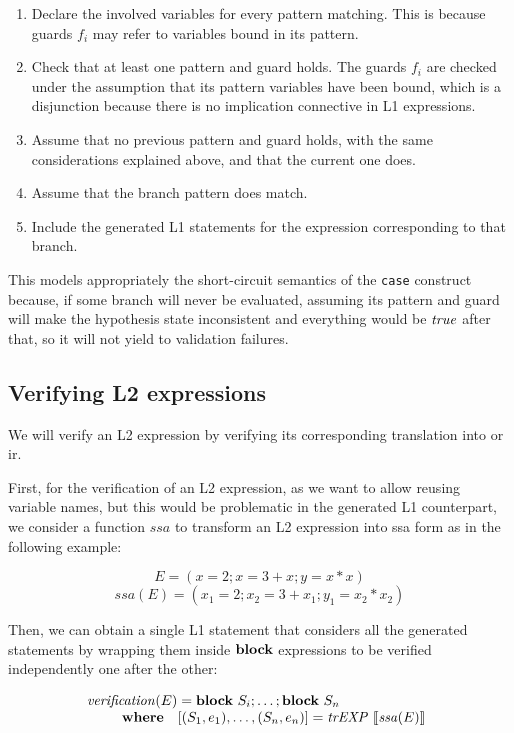 \begin{enumerate}
  \item Declare the involved variables for every pattern matching. This is because guards $f_i$ may refer to variables bound in its pattern.
  \item Check that at least one pattern and guard holds. The guards $f_i$ are checked under the assumption that its pattern variables have been bound, which is a disjunction because there is no implication connective in L1 expressions.
  \item Assume that no previous pattern and guard holds, with the same considerations explained above, and that the current one does.
  \item Assume that the branch pattern does match.
  \item Include the generated L1 statements for the expression corresponding to that branch.
\end{enumerate}

This models appropriately the short-circuit semantics of the \verb|case|
construct because, if some branch will never be evaluated, assuming its pattern
and guard will make the hypothesis state inconsistent and everything would be
$\mathit{true}$ after that, so it will not yield to validation failures.

\subsection{Verifying L2 expressions}
\label{sec:verificationprocess}

We will verify an L2 expression by verifying its corresponding translation into
or \gls{ir}.

First, for the verification of an L2 expression, as we want to allow reusing 
variable names, but this would be problematic in the generated L1 counterpart,
we consider a function $ssa$ to transform an L2 expression into \gls{ssa} form
as in the following example:

$$E =  (x = 2;x = 3 + x; y = x * x)$$
$$\mathit{ssa}(E) = (x_1 = 2;x_2 = 3 + x_1;y_1 = x_2 * x_2)$$

Then, we can obtain a single L1 statement that considers all the generated
statements by wrapping them inside $\textbf{block}$ expressions to be verified 
independently one after the other:

\[
\begin{array}{l}
\mathit{verification}(E) = \textbf{block}~S_i;\dots;\textbf{block}~S_n\\
\qquad 
\begin{array}{ll}
\textbf{where} & [(S_1,e_1),\dots,(S_n, e_n)] = \mathit{trEXP}~\llbracket\mathit{ssa}(E)\rrbracket
\end{array}
\end{array}
\]

